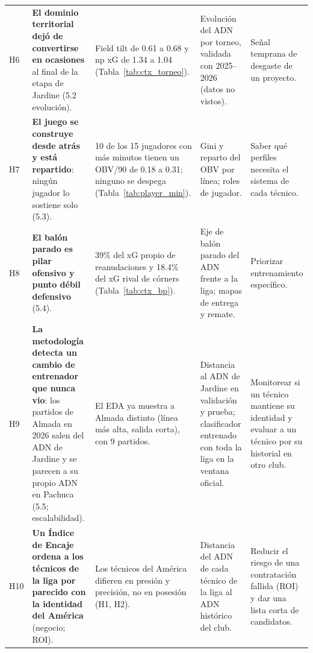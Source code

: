 \documentclass[11pt,a4paper]{article}
\begin{document}
{\begin{longtable}{p{0.55cm}p{4.4cm}p{3.6cm}p{3.6cm}p{3.2cm}}
H6 & \textbf{El dominio territorial dejó de convertirse en ocasiones} al final de la etapa de Jardine (5.2 evolución). & Field tilt de 0.61 a 0.68 y np xG de 1.34 a 1.04 (Tabla~\ref{tab:ctx_torneo}). & Evolución del ADN por torneo, validada con 2025--2026 (datos no vistos). & Señal temprana de desgaste de un proyecto.\\
H7 & \textbf{El juego se construye desde atrás y está repartido}: ningún jugador lo sostiene solo (5.3). & 10 de los 15 jugadores con más minutos tienen un OBV/90 de 0.18 a 0.31; ninguno se despega (Tabla~\ref{tab:player_min}). & Gini y reparto del OBV por línea; roles de jugador. & Saber qué perfiles necesita el sistema de cada técnico.\\
H8 & \textbf{El balón parado es pilar ofensivo y punto débil defensivo} (5.4). & 39\% del xG propio de reanudaciones y 18.4\% del xG rival de córners (Tabla~\ref{tab:ctx_bp}). & Eje de balón parado del ADN frente a la liga; mapas de entrega y remate. & Priorizar entrenamiento específico.\\
H9 & \textbf{La metodología detecta un cambio de entrenador que nunca vio}: los partidos de Almada en 2026 salen del ADN de Jardine y se parecen a su propio ADN en Pachuca (5.5; escalabilidad). & El EDA ya muestra a Almada distinto (línea más alta, salida corta), con 9 partidos. & Distancia al ADN de Jardine en validación y prueba; clasificador entrenado con toda la liga en la ventana oficial. & Monitorear si un técnico mantiene su identidad y evaluar a un técnico por su historial en otro club.\\
H10 & \textbf{Un Índice de Encaje ordena a los técnicos de la liga por parecido con la identidad del América} (negocio; ROI). & Los técnicos del América difieren en presión y precisión, no en posesión (H1, H2). & Distancia del ADN de cada técnico de la liga al ADN histórico del club. & Reducir el riesgo de una contratación fallida (ROI) y dar una lista corta de candidatos.\\
\end{longtable}}

\end{document}
